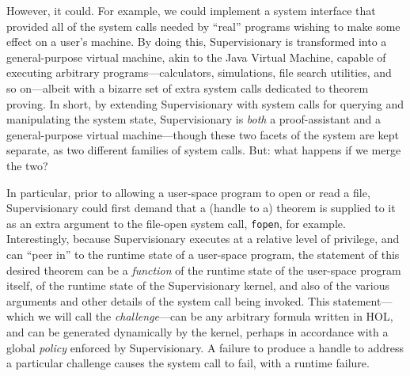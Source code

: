 \documentclass[a4paper, UKenglish, cleveref, autoref, thm-restate, colorlinks]{lipics-v2021}
\begin{document}
However, it could.
For example, we could implement a system interface that provided all of the system calls needed by ``real'' programs wishing to make some effect on a user's machine.
By doing this, Supervisionary is transformed into a general-purpose virtual machine, akin to the Java Virtual Machine, capable of executing arbitrary programs---calculators, simulations, file search utilities, and so on---albeit with a bizarre set of extra system calls dedicated to theorem proving.
In short, by extending Supervisionary with system calls for querying and manipulating the system state, Supervisionary is \emph{both} a proof-assistant and a general-purpose virtual machine---though these two facets of the system are kept separate, as two different families of system calls.
But: what happens if we merge the two?

In particular, prior to allowing a user-space program to open or read a file, Supervisionary could first demand that a (handle to a) theorem is supplied to it as an extra argument to the file-open system call, \texttt{fopen}, for example.
Interestingly, because Supervisionary executes at a relative level of privilege, and can ``peer in'' to the runtime state of a user-space program, the statement of this desired theorem can be a \emph{function} of the runtime state of the user-space program itself, of the runtime state of the Supervisionary kernel, and also of the various arguments and other details of the system call being invoked.
This statement---which we will call the \emph{challenge}---can be any arbitrary formula written in HOL, and can be generated dynamically by the kernel, perhaps in accordance with a global \emph{policy} enforced by Supervisionary.
A failure to produce a handle to address a particular challenge causes the system call to fail, with a runtime failure.
\end{document}
